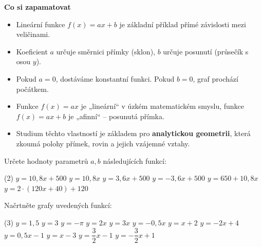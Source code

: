 \documentclass[12pt,a4paper]{article}
\begin{document}
\begin{notebox}
\textbf{Co si zapamatovat}
\begin{itemize}
    \item Lineární funkce \(f(x)=ax+b\) je základní příklad přímé závislosti mezi veličinami.
    \item Koeficient \(a\) určuje směrnici přímky (sklon), \(b\) určuje posunutí (průsečík s osou \(y\)).
    \item Pokud \(a=0\), dostáváme konstantní funkci. Pokud \(b=0\), graf prochází počátkem.
    \item Funkce \(f(x)=ax\) je „lineární“ v úzkém matematickém smyslu,  
          funkce \(f(x)=ax+b\) je „afinní“ – posunutá přímka.
    \item Studium těchto vlastností je základem pro \textbf{analytickou geometrii},  
          která zkoumá polohy přímek, rovin a jejich vzájemné vztahy.
\end{itemize}
\end{notebox}









\exercisepart
\setcounter{section}{1} %


\begin{exercise}[Parametry $a,b$ v předpisu $y=ax+b$]
    Určete hodnoty parametrů $a,b$ následujících funkcí:
    \begin{tasks}(2)
        \task $y=10{,}8x+500$
        \task $y=10{,}8x$
        \task $y=3{,}6x+500$
        \task $y=-3{,}6x+500$
        \task $y=650+10{,}8x$
        \task $y=2\cdot(120x+40)+120$
    \end{tasks}
\end{exercise}


\begin{exercise}
    Načrtněte grafy uvedených funkcí:
    \begin{tasks}(3)
        \task $y=1{,}5$
        \task $y=3$
        \task $y=-\pi$
        \task $y=2x$
        \task $y=3x$
        \task $y=-0{,}5x$
        \task $y=x+2$
        \task $y=-2x+4$
        \task $y=0{,}5x-1$
        \task $y=x-3$
        \task $y=\dfrac{3}{2}x-1$
        \task $y=-\dfrac{3}{2}x+1$
    \end{tasks}
\end{exercise}
\end{document}
